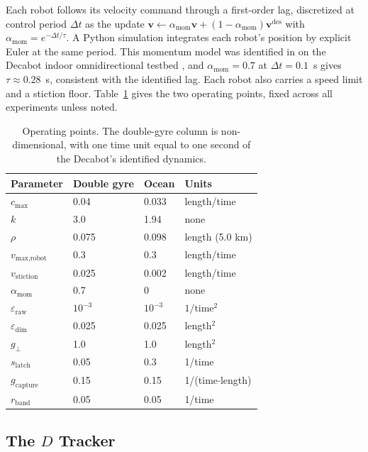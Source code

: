 \documentclass[lettersize,journal]{IEEEtran}
\begin{document}
Each robot follows its velocity command through a first-order lag,
discretized at control period $\Delta t$ as the update
$\mathbf{v} \leftarrow \alpha_{\text{mom}}\mathbf{v} + (1 -
\alpha_{\text{mom}})\mathbf{v}^{\text{des}}$ with
$\alpha_{\text{mom}} = e^{-\Delta t/\tau}$. A Python simulation integrates
each robot's position by explicit Euler at the same period. This momentum model was
identified in \cite{10} on the Decabot indoor omnidirectional testbed
\cite{31,32}, and $\alpha_{\text{mom}} = 0.7$ at $\Delta t = 0.1$~s gives
$\tau \approx 0.28$~s, consistent with the identified lag. Each robot also
carries a speed limit and a stiction floor. Table~\ref{tab:params} gives
the two operating points, fixed across all experiments unless noted.

\begin{table}[!t]
\caption{Operating points. The double-gyre column is non-dimensional,
with one time unit equal to one second of the Decabot's identified
dynamics.}
\label{tab:params}
\centering
\begin{tabular}{llll}
\hline
Parameter & Double gyre & Ocean & Units \\
\hline
$c_{\max}$              & 0.04  & 0.033  & length/time \\
$k$                     & 3.0   & 1.94   & none \\
$\rho$                  & 0.075 & 0.098  & length (5.0 km) \\
$v_{\text{max,robot}}$  & 0.3   & 0.3    & length/time \\
$v_{\text{stiction}}$   & 0.025 & 0.002  & length/time \\
$\alpha_{\text{mom}}$   & 0.7   & 0      & none \\
$\varepsilon_{\text{raw}}$ & $10^{-3}$ & $10^{-3}$ & $1/\text{time}^2$ \\
$\varepsilon_{\dim}$    & 0.025 & 0.025  & length$^2$ \\
$g_\perp$               & 1.0   & 1.0    & length$^2$ \\
$s_{\mathrm{latch}}$     & 0.05  & 0.3    & 1/time \\
$g_{\text{capture}}$    & 0.15  & 0.15   & 1/(time$\cdot$length) \\
$r_{\text{band}}$       & 0.05  & 0.05   & 1/time \\
\hline
\end{tabular}
\end{table}

\subsection{The $D$ Tracker}
\label{sec:sep_controller}
\end{document}
